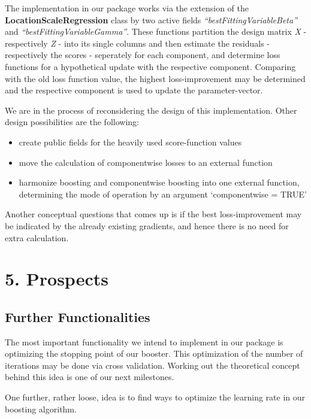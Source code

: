 \documentclass[
]{report}
\providecommand{\tightlist}{%
  \setlength{\itemsep}{0pt}\setlength{\parskip}{0pt}}
\begin{document}
The implementation in our package works via the extension of the
\textbf{LocationScaleRegression} class by two active fields
\emph{``bestFittingVariableBeta''} and
\emph{``bestFittingVariableGamma''}. These functions partition the
design matrix \emph{X} - respectively \emph{Z} - into its single columns
and then estimate the residuals - respectively the scores - seperately
for each component, and determine loss functions for a hypothetical
update with the respective component. Comparing with the old loss
function value, the highest loss-improvement may be determined and the
respective component is used to update the parameter-vector.

We are in the process of reconsidering the design of this
implementation. Other design possibilities are the following:

\begin{itemize}
\tightlist
\item
  create public fields for the heavily used score-function values
\item
  move the calculation of componentwise losses to an external function
\item
  harmonize boosting and componentwise boosting into one external
  function, determining the mode of operation by an argument
  `componentwise = TRUE'
\end{itemize}

Another conceptual questions that comes up is if the best
loss-improvement may be indicated by the already existing gradients, and
hence there is no need for extra calculation.

\hypertarget{prospects}{%
\chapter{5. Prospects}\label{prospects}}

\hypertarget{further-functionalities}{%
\section{Further Functionalities}\label{further-functionalities}}

The most important functionality we intend to implement in our package
is optimizing the stopping point of our booster. This optimization of
the number of iterations may be done via cross validation. Working out
the theoretical concept behind this idea is one of our next milestones.

One further, rather loose, idea is to find ways to optimize the learning
rate in our boosting algorithm.
\end{document}
